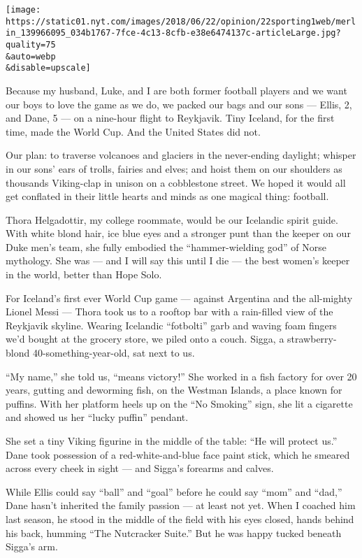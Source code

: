 \texttt{[image: https://static01.nyt.com/images/2018/06/22/opinion/22sporting1web/merlin\_139966095\_034b1767-7fce-4c13-8cfb-e38e6474137c-articleLarge.jpg?quality=75\\\&auto=webp\\\&disable=upscale]}

Because my husband, Luke, and I are both former football players and we
want our boys to love the game as we do, we packed our bags and our sons
--- Ellis, 2, and Dane, 5 --- on a nine-hour flight to Reykjavik. Tiny
Iceland, for the first time, made the World Cup. And the United States
did not.

Our plan: to traverse volcanoes and glaciers in the never-ending
daylight; whisper in our sons' ears of trolls, fairies and elves; and
hoist them on our shoulders as thousands Viking-clap in unison on a
cobblestone street. We hoped it would all get conflated in their little
hearts and minds as one magical thing: football.

Thora Helgadottir, my college roommate, would be our Icelandic spirit
guide. With white blond hair, ice blue eyes and a stronger punt than the
keeper on our Duke men's team, she fully embodied the ``hammer-wielding
god'' of Norse mythology. She was --- and I will say this until I die
--- the best women's keeper in the world, better than Hope Solo.

For Iceland's first ever World Cup game --- against Argentina and the
all-mighty Lionel Messi --- Thora took us to a rooftop bar with a
rain-filled view of the Reykjavik skyline. Wearing Icelandic
``fotbolti'' garb and waving foam fingers we'd bought at the grocery
store, we piled onto a couch. Sigga, a strawberry-blond
40-something-year-old, sat next to us.

``My name,'' she told us, ``means victory!'' She worked in a fish
factory for over 20 years, gutting and deworming fish, on the Westman
Islands, a place known for puffins. With her platform heels up on the
``No Smoking'' sign, she lit a cigarette and showed us her ``lucky
puffin'' pendant.

She set a tiny Viking figurine in the middle of the table: ``He will
protect us.'' Dane took possession of a red-white-and-blue face paint
stick, which he smeared across every cheek in sight --- and Sigga's
forearms and calves.

While Ellis could say ``ball'' and ``goal'' before he could say ``mom''
and ``dad,'' Dane hasn't inherited the family passion --- at least not
yet. When I coached him last season, he stood in the middle of the field
with his eyes closed, hands behind his back, humming ``The Nutcracker
Suite.'' But he was happy tucked beneath Sigga's arm.


